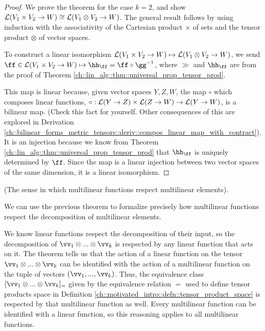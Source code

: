 \begin{proof}
    We prove the theorem for the case $k = 2$, and show $\mathcal{L}(V_1 \times V_2 \rightarrow W) \cong \mathcal{L}(V_1 \otimes V_2 \rightarrow W)$. The general result follows by using induction with the associativity of the Cartesian product $\times$ of sets and the tensor product $\otimes$ of vector spaces.
    
    To construct a linear isomorphism $\mathcal{L}(V_1 \times V_2 \rightarrow W) \mapsto \mathcal{L}(V_1 \otimes V_2 \rightarrow W)$, we send \\ ${\ff \in \LLLL(V_1 \times V_2 \rightarrow W) \mapsto \hh_\ff = \ff \circ \gg^{-1}}$, where $\gg$ and $\hh_\ff$ are from the proof of Theorem \ref{ch::lin_alg::thm::universal_prop_tensor_prod}.
    
    This map is linear because, given vector spaces $Y, Z, W$, the map $\circ$ which composes linear functions, ${\circ:\mathcal{L}(Y \rightarrow Z) \times \mathcal{L}(Z \rightarrow W) \rightarrow \mathcal{L}(Y \rightarrow W)}$, is a bilinear map. (Check this fact for yourself. Other consequences of this are explored in Derivation \ref{ch::bilinear_forms_metric_tensors::deriv::compos_linear_map_with_contract}). It is an injection because we know from Theorem \ref{ch::lin_alg::thm::universal_prop_tensor_prod} that $\hh_\ff$ is uniquely determined by $\ff$. Since the map is a linear injection between two vector spaces of the same dimension, it is a linear isomorphism.
\end{proof}

\begin{remark}
    (The sense in which multilinear functions respect multilinear elements).
    
    We can use the previous theorem to formalize precisely how multilinear functions respect the decomposition of multilinear elements.
    
    We know linear functions respect the decomposition of their input, so the decomposition of $\vv_1 \otimes ... \otimes \vv_k$ is respected by any linear function that acts on it. The theorem tells us that the action of a linear function on the tensor $\vv_1 \otimes ... \otimes \vv_k$ can be identified with the action of a multilinear function on the tuple of vectors $(\vv_1, ..., \vv_k)$. Thus, the equivalence class $[\vv_1 \otimes ... \otimes \vv_k]_=$ given by the equivalence relation $=$ used to define tensor products space in Definition \ref{ch::motivated_intro::defn::tensor_product_space} is respected by that multilinear function as well. Every multilinear function can be identified with a linear function, so this reasoning applies to all multilinear functions.
\end{remark}

